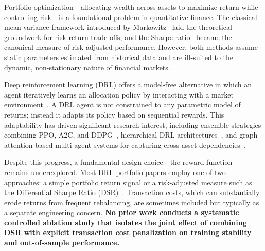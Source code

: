 \documentclass[conference]{IEEEtran}
\begin{document}
Portfolio optimization—allocating wealth across assets to maximize return while
controlling risk—is a foundational problem in quantitative finance. The classical
mean-variance framework introduced by Markowitz~\cite{Markowitz1952} laid the
theoretical groundwork for risk-return trade-offs, and the Sharpe
ratio~\cite{Sharpe1966} became the canonical measure of risk-adjusted performance.
However, both methods assume static parameters estimated from historical data and
are ill-suited to the dynamic, non-stationary nature of financial markets.

Deep reinforcement learning (DRL) offers a model-free alternative in which an
agent iteratively learns an allocation policy by interacting with a market
environment~\cite{Sutton2018RL}. A DRL agent is not constrained to any parametric
model of returns; instead it adapts its policy based on sequential rewards. This
adaptability has driven significant research interest, including ensemble
strategies combining PPO, A2C, and DDPG~\cite{Liu2020Ensemble}, hierarchical DRL
architectures~\cite{Sun2025HDRL}, and graph attention-based multi-agent systems
for capturing cross-asset dependencies~\cite{Zhang2025GraphRL}.

Despite this progress, a fundamental design choice—the reward function—remains
underexplored. Most DRL portfolio papers employ one of two approaches: a simple
portfolio return signal or a risk-adjusted measure such as the Differential Sharpe
Ratio (DSR)~\cite{Moody2001}. Transaction costs, which can substantially erode
returns from frequent rebalancing, are sometimes included but typically as a
separate engineering concern. \textbf{No prior work conducts a systematic
controlled ablation study that isolates the joint effect of combining DSR with
explicit transaction cost penalization on training stability and out-of-sample
performance.}
\end{document}
